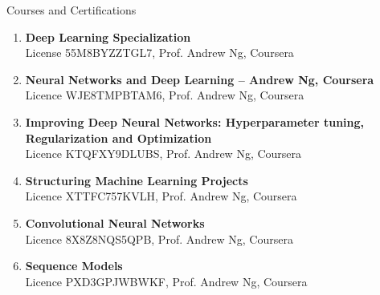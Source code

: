 \documentclass{resume}
\begin{document}
\begin{rSection}{Courses and Certifications}
    \begin{enumerate}[leftmargin=0.45cm, itemsep=0em, topsep=0.5em, parsep=0.2em]
        \item \textbf{Deep Learning Specialization}\\
        License 55M8BYZZTGL7, Prof. Andrew Ng, Coursera
        \item \textbf{Neural Networks and Deep Learning – Andrew Ng, Coursera}\\
        Licence WJE8TMPBTAM6, Prof. Andrew Ng, Coursera
        \item \textbf{Improving Deep Neural Networks: Hyperparameter tuning, Regularization and Optimization} \\
        Licence KTQFXY9DLUBS, Prof. Andrew Ng, Coursera
        \item \textbf{Structuring Machine Learning Projects} \\
        Licence XTTFC757KVLH, Prof. Andrew Ng, Coursera
        \item \textbf{Convolutional Neural Networks}\\
        Licence 8X8Z8NQS5QPB, Prof. Andrew Ng, Coursera
        \item \textbf{Sequence Models}\\
        Licence PXD3GPJWBWKF, Prof. Andrew Ng, Coursera

    \end{enumerate}
\end{rSection}
\end{document}
